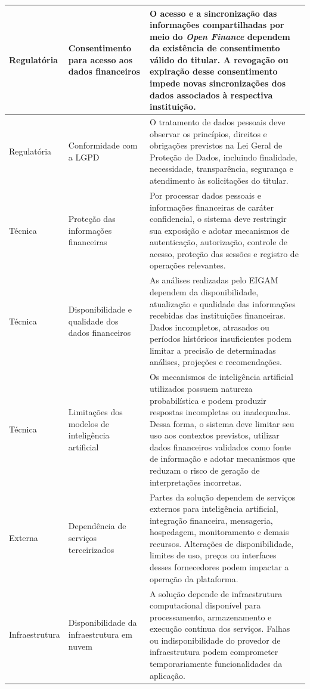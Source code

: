 {\begin{longtable}{|p{2.3cm}|p{4.0cm}|p{8.2cm}|}
Regulatória &
Consentimento para acesso aos dados financeiros &
O acesso e a sincronização das informações compartilhadas por meio do \textit{Open Finance} dependem da existência de consentimento válido do titular. A revogação ou expiração desse consentimento impede novas sincronizações dos dados associados à respectiva instituição.
\\ \hline


Regulatória &
Conformidade com a LGPD &
O tratamento de dados pessoais deve observar os princípios, direitos e obrigações previstos na Lei Geral de Proteção de Dados, incluindo finalidade, necessidade, transparência, segurança e atendimento às solicitações do titular.
\\ \hline


Técnica &
Proteção das informações financeiras &
Por processar dados pessoais e informações financeiras de caráter confidencial, o sistema deve restringir sua exposição e adotar mecanismos de autenticação, autorização, controle de acesso, proteção das sessões e registro de operações relevantes.
\\ \hline


Técnica &
Disponibilidade e qualidade dos dados financeiros &
As análises realizadas pelo EIGAM dependem da disponibilidade, atualização e qualidade das informações recebidas das instituições financeiras. Dados incompletos, atrasados ou períodos históricos insuficientes podem limitar a precisão de determinadas análises, projeções e recomendações.
\\ \hline


Técnica &
Limitações dos modelos de inteligência artificial &
Os mecanismos de inteligência artificial utilizados possuem natureza probabilística e podem produzir respostas incompletas ou inadequadas. Dessa forma, o sistema deve limitar seu uso aos contextos previstos, utilizar dados financeiros validados como fonte de informação e adotar mecanismos que reduzam o risco de geração de interpretações incorretas.
\\ \hline


Externa &
Dependência de serviços terceirizados &
Partes da solução dependem de serviços externos para inteligência artificial, integração financeira, mensageria, hospedagem, monitoramento e demais recursos. Alterações de disponibilidade, limites de uso, preços ou interfaces desses fornecedores podem impactar a operação da plataforma.
\\ \hline


Infraestrutura &
Disponibilidade da infraestrutura em nuvem &
A solução depende de infraestrutura computacional disponível para processamento, armazenamento e execução contínua dos serviços. Falhas ou indisponibilidade do provedor de infraestrutura podem comprometer temporariamente funcionalidades da aplicação.
\\ \hline



\end{longtable}}
